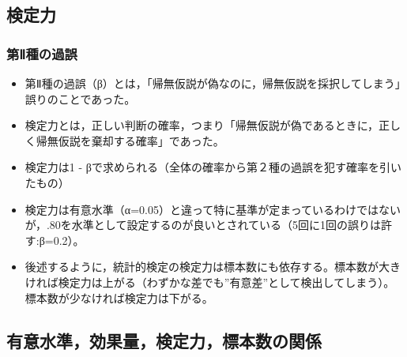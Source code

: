 \documentclass[]{article}
\begin{document}
\subsection{検定力}

\subsubsection{第Ⅱ種の過誤}\label{-1}

\begin{itemize}
\item
  第Ⅱ種の過誤（β）とは，「帰無仮説が偽なのに，帰無仮説を採択してしまう」誤りのことであった。\\
\item
  検定力とは，正しい判断の確率，つまり「帰無仮説が偽であるときに，正しく帰無仮説を棄却する確率」であった。\\
\item
  検定力は1 -
  βで求められる（全体の確率から第２種の過誤を犯す確率を引いたもの）
\item
  検定力は有意水準（α=0.05）と違って特に基準が定まっているわけではないが，.80を水準として設定するのが良いとされている（5回に1回の誤りは許す:β=0.2）。
\item
  後述するように，統計的検定の検定力は標本数にも依存する。標本数が大きければ検定力は上がる（わずかな差でも''有意差''として検出してしまう）。標本数が少なければ検定力は下がる。
\end{itemize}

\subsection{有意水準，効果量，検定力，標本数の関係}
\end{document}
